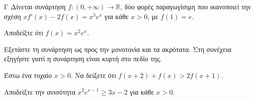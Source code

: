 \begin{thema}{Γ}
Δίνεται συνάρτηση $f:(0,+\infty)\to\mathbb{R}$, δύο φορές παραγωγίσιμη που ικανοποιεί την σχέση $x f'(x) - 2f(x) = x^3 e^x$ για κάθε $x > 0$, με $f(1) = e$.
\begin{erwthma}
  \item Αποδείξτε ότι $f(x) = x^2 e^x$.
  \item Εξετάστε τη συνάρτηση ως προς την μονοτονία και τα ακρότατα. Στη συνέχεια εξηγήστε γιατί η συνάρτηση είναι κυρτή στο πεδίο της.
  \item Έστω ένα τυχαίο $x > 0$. Να δείξετε ότι $f(x+2) + f(x) > 2f(x+1)$.
  \item Αποδείξτε την ανισότητα $x^2 e^{x-1} \ge 3x - 2$ για κάθε $x > 0$.
\end{erwthma}
\end{thema}
